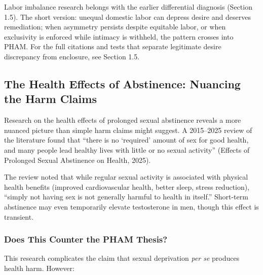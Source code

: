 \documentclass[12pt, letterpaper]{article}
\begin{document}
Labor imbalance research belongs with the earlier differential diagnosis (Section 1.5). The short version: unequal domestic labor can depress desire and deserves remediation; when asymmetry persists despite equitable labor, or when exclusivity is enforced while intimacy is withheld, the pattern crosses into PHAM. For the full citations and tests that separate legitimate desire discrepancy from enclosure, see Section 1.5.

\subsection{The Health Effects of Abstinence: Nuancing the Harm Claims}

Research on the health effects of prolonged sexual abstinence reveals a more nuanced picture than simple harm claims might suggest. A 2015--2025 review of the literature found that ``there is no `required' amount of sex for good health, and many people lead healthy lives with little or no sexual activity'' (Effects of Prolonged Sexual Abstinence on Health, 2025).

The review noted that while regular sexual activity is associated with physical health benefits (improved cardiovascular health, better sleep, stress reduction), ``simply not having sex is not generally harmful to health in itself.'' Short-term abstinence may even temporarily elevate testosterone in men, though this effect is transient.

\subsubsection{Does This Counter the PHAM Thesis?}

This research complicates the claim that sexual deprivation \textit{per se} produces health harm. However:
\end{document}
